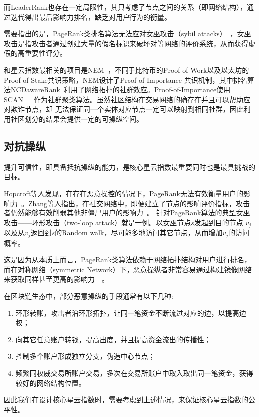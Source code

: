 而LeaderRank也存在一定局限性，其只考虑了节点之间的关系（即网络结构），通过迭代得出最后影响力排名，缺乏对用户行为的衡量。

需要指出的是，PageRank类排名算法无法应对女巫攻击（sybil attacks）~\cite{cheng2006manipulability}，女巫攻击是指攻击者通过创建大量的假名标识来破坏对等网络的评价系统，从而获得虚假的高重要性评分。


和星云指数最相关的项目是NEM~\cite{nem}，不同于比特币的Proof-of-Work以及以太坊的Proof-of-Stake共识策略，NEM设计了Proof-of-Importance 共识机制，其中排名算法NCDawareRank~\cite{Nikolakopoulos2013}利用了网络拓扑的社群效应。Proof-of-Importance使用SCAN~\cite{xu2007scan}~\cite{shiokawa2015scan}~\cite{chang2017mathsf}作为社群聚类算法。虽然社区结构在交易网络的确存在并且可以帮助应对欺诈节点，却 无法保证同一个实体对应节点一定可以映射到相同社群，因此利用社区划分的结果会提供一定的可操纵空间。


\subsection{对抗操纵}

提升可信性，即具备抵抗操纵的能力，是核心星云指数最重要同时也是最具挑战的目标。

Hopcroft等人发现，在存在恶意操控的情况下，PageRank无法有效衡量用户的影响力~\cite{hopcroft2007manipulation}。Zhang等人指出，在社交网络中，即便建立了节点的影响评价指标，攻击者仍然能够有效削弱其他非僵尸用户的影响力~\cite{zhang2016truetop}。
针对PageRank算法的典型女巫攻击——环形攻击（two-loop attack）就是一例。以女巫节点$s$发起到目的节点
$v_j$以及从$v_j$返回到$s$的Random walk，尽可能多地访问其它节点，从而增加$v_j$的访问概率。

这是因为从本质上而言，PageRank类算法依赖于网络拓扑结构对用户进行排名，而在对称网络（symmetric Network）下，恶意操纵者非常容易通过构建镜像网络来获取同样甚至更高的影响力~\cite{cheng2005sybilproof}~\cite{cheng2006manipulability}。


在区块链生态中，部分恶意操纵的手段通常有以下几种:
\begin{enumerate}
\item 环形转账，攻击者沿环形拓扑，让同一笔资金不断流过对应的边，以提高边权；
\item 向其它任意账户转钱，提高出度，并且提高资金流出的传播性；
\item 控制多个账户形成独立分支，伪造中心节点；
\item 频繁同权威交易所账户交易，多次在交易所账户中取入取出同一笔资金，获得较好的网络结构位置。
\end{enumerate}

因此我们在设计核心星云指数时，需要考虑到上述情况，来保证核心星云指数的公平性。




